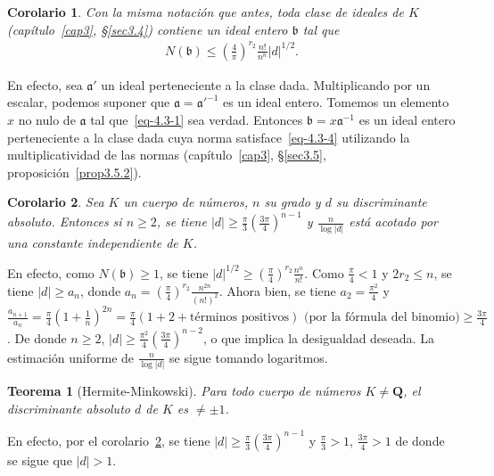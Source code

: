 \documentclass[bibtotoc,leqno,spanish]{amsbook}
\newcommand{\QQ}{\mathbf{Q}}
\newcommand{\idl}[1]{\mathfrak{#1}}
\newcommand{\abs}[1]{\left\lvert#1\right\rvert}
\numberwithin{equation}{section}
\theoremstyle{note}
\theoremstyle{note}
\newtheorem{theorem}{Teorema}
\newtheorem{corollary}{Corolario}
\theoremstyle{rem}
\numberwithin{theorem}{section}
\numberwithin{proposition}{section}
\numberwithin{definition}{section}
\numberwithin{lemma}{section}
\numberwithin{corollary}{section}
\numberwithin{example}{section}
\numberwithin{footnote}{section}%
\begin{document}
\begin{corollary}\label{cor4.3.1}
Con la misma notaci\'on que antes, toda clase de ideales de $K$ (cap\'itulo~\ref{cap3}, \S\ref{sec3.4})
contiene un ideal entero $\idl{b}$ tal que
\begin{gather}\label{eq-4.3-4}
N(\idl{b})\leq\left(\frac{4}{\pi}\right)^{r_{2}}\frac{n!}{n^{n}}\abs{d}^{1/2}.
\end{gather}
\end{corollary}

En efecto, sea $\idl{a}'$ un ideal perteneciente a la clase dada. Multiplicando por un escalar, podemos suponer
que $\idl{a} = \idl{a}'^{-1}$ es un ideal entero. Tomemos un elemento $x$ no nulo de $\idl{a}$ tal que~\eqref{eq-4.3-1}
sea verdad. Entonces $\idl{b} = x\idl{a}^{-1}$ es un ideal entero perteneciente a la clase dada cuya norma
satisface~\eqref{eq-4.3-4} utilizando la multiplicatividad de las normas (cap\'itulo~\ref{cap3}, \S\ref{sec3.5},
proposici\'on~\ref{prop3.5.2}).

\begin{corollary}\label{cor4.3.2}
Sea $K$ un cuerpo de n\'umeros, $n$ su grado y $d$ su discriminante absoluto. Entonces si $n\geq 2$, se tiene
$\abs{d}\geq\frac{\pi}{3}\left(\frac{3\pi}{4}\right)^{n-1}$ y $\frac{n}{\log\abs{d}}$ est\'a acotado por una
constante independiente de $K$.
\end{corollary}

En efecto, como $N(\idl{b})\geq 1$, se tiene $\abs{d}^{1/2}\geq\left(\frac{\pi}{4}\right)^{r_{2}}\frac{n^{n}}{n!}$.
Como $\frac{\pi}{4} < 1$ y $2r_{2}\leq n$, se tiene $\abs{d}\geq a_{n}$, donde
$a_{n} = \left(\frac{\pi}{4}\right)^{r_{2}}\frac{n^{2n}}{(n!)^{2}}$. Ahora bien, se tiene $a_{2} = \frac{\pi^{2}}{4}$
y $\frac{a_{n+1}}{a_{n}} = \frac{\pi}{4}\left(1+\frac{1}{n}\right)^{2n} = \frac{\pi}{4}(1+2+\text{t\'erminos positivos})
\text{ (por la f\'ormula del binomio)} \geq \frac{3\pi}{4}$. De donde $n\geq 2$,
$\abs{d}\geq\frac{\pi^{2}}{4}\left(\frac{3\pi}{4}\right)^{n-2}$,
o que implica la desigualdad deseada. La estimaci\'on uniforme de $\frac{n}{\log\abs{d}}$ se sigue tomando logaritmos.

\begin{theorem}[Hermite-Minkowski]
Para todo cuerpo de n\'umeros $K\neq\QQ$, el discriminante absoluto $d$ de $K$ es $\neq\pm 1$.
\end{theorem}

En efecto, por el corolario~\ref{cor4.3.2}, se tiene $\abs{d}\geq\frac{\pi}{3}\left(\frac{3\pi}{4}\right)^{n-1}$ y
$\frac{\pi}{3} >1$, $\frac{3\pi}{4} > 1$ de donde se sigue que $\abs{d} > 1$.
\end{document}
